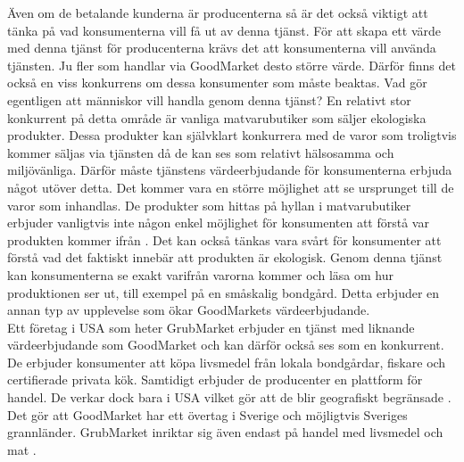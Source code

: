 \documentclass[10pt,a4paper,oneside]{article}
\begin{document}
Även om de betalande kunderna är producenterna så är det också viktigt att tänka på vad konsumenterna vill få ut av denna tjänst. För att skapa ett värde med denna tjänst för producenterna krävs det att konsumenterna vill använda tjänsten. Ju fler som handlar via GoodMarket desto större värde. Därför finns det också en viss konkurrens om dessa konsumenter som måste beaktas. Vad gör egentligen att människor vill handla genom denna tjänst? En relativt stor konkurrent på detta område är vanliga matvarubutiker som säljer ekologiska produkter. Dessa produkter kan självklart konkurrera med de varor som troligtvis kommer säljas via tjänsten då de kan ses som relativt hälsosamma och miljövänliga. Därför måste tjänstens värdeerbjudande för konsumenterna erbjuda något utöver detta. Det kommer vara en  större möjlighet att se ursprunget till de varor som inhandlas. De produkter som hittas på hyllan i matvarubutiker erbjuder vanligtvis inte någon enkel möjlighet för konsumenten att förstå var produkten kommer ifrån \cite{N3}. Det kan också tänkas vara svårt för konsumenter att förstå vad det faktiskt innebär att produkten är ekologisk. Genom denna tjänst kan konsumenterna se exakt varifrån varorna kommer och läsa om hur produktionen ser ut, till exempel på en småskalig bondgård. Detta erbjuder en annan typ av upplevelse som ökar GoodMarkets värdeerbjudande. \\

Ett företag i USA som heter GrubMarket erbjuder en tjänst med liknande värdeerbjudande som GoodMarket och kan därför också ses som en konkurrent. De erbjuder konsumenter att köpa livsmedel från lokala bondgårdar, fiskare och certifierade privata kök. Samtidigt erbjuder de producenter en plattform för handel. De verkar dock bara i USA vilket gör att de blir geografiskt begränsade \cite{Grubmarket1}. Det gör att GoodMarket har ett övertag i Sverige och möjligtvis Sveriges grannländer. GrubMarket inriktar sig även endast på handel med livsmedel och mat \cite{Grubmarket1}. \\
\end{document}
